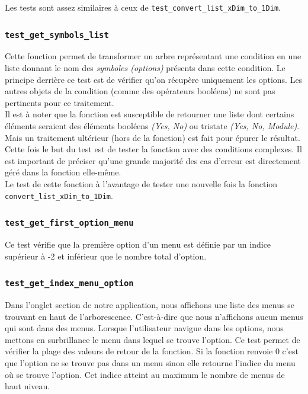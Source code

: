 ﻿\documentclass[17pts]{report}
\begin{document}
Les tests sont assez similaires à ceux de
\verb|test_convert_list_xDim_to_1Dim|. \\

\subsubsection{\texttt{test\_get\_symbols\_list}}
\label{ssub:TestGetSymbolsList}
Cette fonction permet de transformer un arbre représentant une condition en une
liste donnant le nom des \textit{symboles (options)} présents dans cette
condition. Le principe derrière ce test est de vérifier qu'on récupère
uniquement les options. Les autres objets de la condition (comme des opérateurs
booléens) ne sont pas pertinents pour ce traitement.\\ Il est à noter que la
fonction est susceptible de retourner une liste dont certains éléments seraient
des éléments booléens \textit{(Yes, No)} ou tristate \textit{(Yes, No,
Module)}.  Mais un traitement ultérieur (hors de la fonction) est fait pour
épurer le résultat.\\

Cette fois le but du test est de tester la fonction avec des conditions
complexes. Il est important de préciser qu'une grande majorité des cas d'erreur
est directement géré dans la fonction elle-même.\\

Le test de cette fonction à l'avantage de tester une nouvelle fois la fonction
\verb|convert_list_xDim_to_1Dim|.

\subsubsection{\texttt{test\_get\_first\_option\_menu}}
\label{ssub:TestGetFirstOptionMenu}
Ce test vérifie que la première option d'un menu est définie par un indice
supérieur à -2 et inférieur que le nombre total d'option.

\subsubsection{\texttt{test\_get\_index\_menu\_option}}
\label{ssub:TestGetIndexMenuOption}
Dans l'onglet section de notre application, nous affichons une liste des menus
se trouvant en haut de l'arborescence. C'est-à-dire que nous n'affichons aucun
menus qui sont dans des menus. Lorsque l'utilisateur navigue dans les options,
nous mettons en surbrillance le menu dans lequel se trouve l'option.  Ce test
permet de vérifier la plage des valeurs de retour de la fonction.  Si la
fonction renvoie 0 c'est que l'option ne se trouve pas dans un menu sinon elle
retourne l'indice du menu où se trouve l'option. Cet indice atteint au
maximum le nombre de menus de haut niveau.
\end{document}
